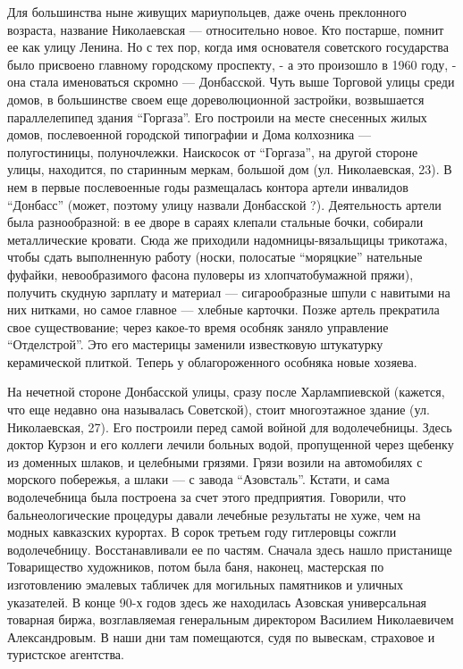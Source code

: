 Для большинства ныне живущих мариупольцев, даже очень преклонного возраста,
название Николаевская — относительно новое. Кто постарше, помнит ее как улицу
Ленина. Но с тех пор, когда имя основателя советского государства было
присвоено главному городскому проспекту, - а это произошло в 1960 году, - она
стала именоваться скромно — Донбасской. Чуть выше Торговой улицы среди домов, в
большинстве своем еще дореволюционной застройки, возвышается параллелепипед
здания \enquote{Горгаза}. Его построили на месте снесенных жилых домов,
послевоенной городской типографии и Дома колхозника — полугостиницы,
полуночлежки.  Наискосок от \enquote{Горгаза}, на другой стороне улицы,
находится, по старинным меркам, большой дом (ул. Николаевская, 23). В нем в
первые послевоенные годы размещалась контора артели инвалидов \enquote{Донбасс}
(может, поэтому улицу назвали Донбасской ?). Деятельность артели была
разнообразной: в ее дворе в сараях клепали стальные бочки, собирали
металлические кровати. Сюда же приходили надомницы-вязальщицы трикотажа, чтобы
сдать выполненную работу (носки, полосатые \enquote{моряцкие} нательные
фуфайки, невообразимого фасона пуловеры из хлопчато­бумажной пряжи), получить
скудную зарплату и материал — сигарообразные шпули с навитыми на них нитками,
но самое главное — хлебные карточки. Позже артель прекратила свое
существование; через какое-то время особняк заняло управление
\enquote{Отделстрой}. Это его мастерицы заменили известковую штукатурку
керамической плиткой. Теперь у облагороженного особняка новые хозяева.


На нечетной стороне Донбасской улицы, сразу после Харлампиевской (кажется, что
еще недавно она называлась Советской), стоит многоэтажное здание (ул.
Николаевская, 27). Его построили перед самой войной для водолечебницы. Здесь
доктор Курзон и его коллеги лечили больных водой, пропущенной через щебенку из
доменных шлаков, и целебными грязями. Грязи возили на автомобилях с морского
побережья, а шлаки — с завода \enquote{Азовсталь}. Кстати, и сама водолечебница была
построена за счет этого предприятия. Говорили, что бальнеологические процедуры
давали лечебные результаты не хуже, чем на модных кавказских курортах. В сорок
третьем году гитлеровцы сожгли водолечебницу. Восстанавливали ее по частям.
Сначала здесь нашло пристанище Товарищество художников, потом была баня,
наконец, мастерская по изготовлению эмалевых табличек для могильных памятников
и уличных указателей. В конце 90-х годов здесь же находилась Азовская
универсальная товарная биржа, возглавляемая генеральным директором Василием
Николаевичем Александровым. В наши дни  там помещаются, судя по вывескам,
страховое и туристское агентства.

